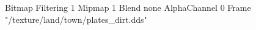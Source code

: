 {Bitmap
	{Filtering 1}
	{Mipmap 1}
	{Blend none}
	{AlphaChannel 0}
	{Frame "/texture/land/town/plates_dirt.dds"}
}
